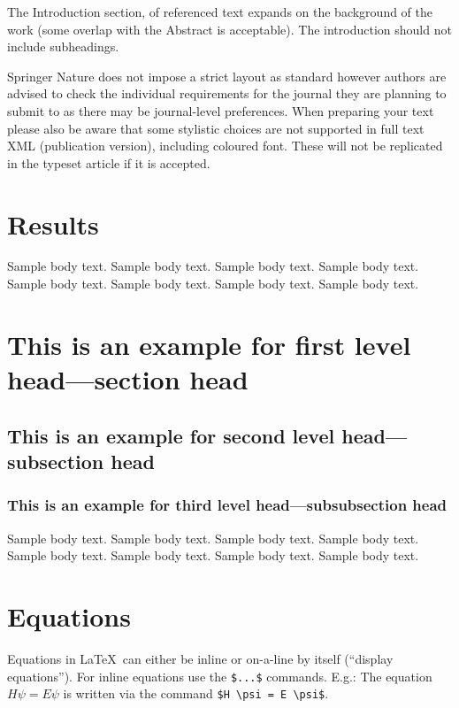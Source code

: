 \documentclass[sn-nature]{sn-jnl}%
\theoremstyle{thmstyleone}%
\theoremstyle{thmstyletwo}%
\theoremstyle{thmstylethree}%
\begin{document}
The Introduction section, of referenced text \cite{bib1} expands on the background of the work (some overlap with the Abstract is acceptable). The introduction should not include subheadings.

Springer Nature does not impose a strict layout as standard however authors are advised to check the individual requirements for the journal they are planning to submit to as there may be journal-level preferences. When preparing your text please also be aware that some stylistic choices are not supported in full text XML (publication version), including coloured font. These will not be replicated in the typeset article if it is accepted. 

\section{Results}\label{sec2}

Sample body text. Sample body text. Sample body text. Sample body text. Sample body text. Sample body text. Sample body text. Sample body text.

\section{This is an example for first level head---section head}\label{sec3}

\subsection{This is an example for second level head---subsection head}\label{subsec2}

\subsubsection{This is an example for third level head---subsubsection head}\label{subsubsec2}

Sample body text. Sample body text. Sample body text. Sample body text. Sample body text. Sample body text. Sample body text. Sample body text. 

\section{Equations}\label{sec4}

Equations in \LaTeX\ can either be inline or on-a-line by itself (``display equations''). For
inline equations use the \verb+$...$+ commands. E.g.: The equation
$H\psi = E \psi$ is written via the command \verb+$H \psi = E \psi$+.
\end{document}

